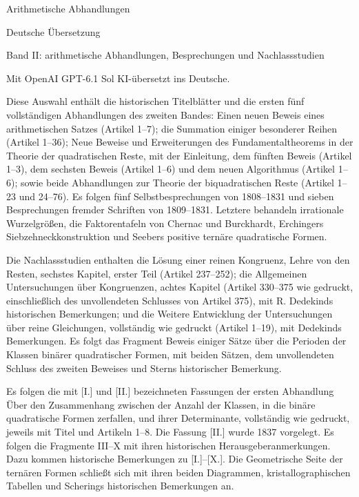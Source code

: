 \begin{titlepage}\centering
\vspace*{0cm}{\Large Carl Friedrich Gauss\par}\bigskip
{\huge Arithmetische Abhandlungen\par}\bigskip
{\Large Deutsche Übersetzung\par}\medskip
{\large Band II: arithmetische Abhandlungen, Besprechungen und Nachlassstudien\par}\bigskip\vfill
{\small Mit OpenAI GPT-6.1 Sol KI-übersetzt ins Deutsche.\par}
\clearpage\thispagestyle{empty}
\begin{minipage}{0.98\linewidth}\small\setlength{\baselineskip}{11.8pt}
Diese Auswahl enthält die historischen Titelblätter und die ersten fünf vollständigen Abhandlungen des zweiten Bandes: Einen neuen Beweis eines arithmetischen Satzes (Artikel 1–7); die Summation einiger besonderer Reihen (Artikel 1–36); Neue Beweise und Erweiterungen des Fundamentaltheorems in der Theorie der quadratischen Reste, mit der Einleitung, dem fünften Beweis (Artikel 1–3), dem sechsten Beweis (Artikel 1–6) und dem neuen Algorithmus (Artikel 1–6); sowie beide Abhandlungen zur Theorie der biquadratischen Reste (Artikel 1–23 und 24–76). Es folgen fünf Selbstbesprechungen von 1808–1831 und sieben Besprechungen fremder Schriften von 1809–1831. Letztere behandeln irrationale Wurzelgrößen, die Faktorentafeln von Chernac und Burckhardt, Erchingers Siebzehneckkonstruktion und Seebers positive ternäre quadratische Formen.

Die Nachlassstudien enthalten die Lösung einer reinen Kongruenz, Lehre von den Resten, sechstes Kapitel, erster Teil (Artikel 237–252); die Allgemeinen Untersuchungen über Kongruenzen, achtes Kapitel (Artikel 330–375 wie gedruckt, einschließlich des unvollendeten Schlusses von Artikel 375), mit R. Dedekinds historischen Bemerkungen; und die Weitere Entwicklung der Untersuchungen über reine Gleichungen, vollständig wie gedruckt (Artikel 1–19), mit Dedekinds Bemerkungen. Es folgt das Fragment Beweis einiger Sätze über die Perioden der Klassen binärer quadratischer Formen, mit beiden Sätzen, dem unvollendeten Schluss des zweiten Beweises und Sterns historischer Bemerkung.

Es folgen die mit [I.] und [II.] bezeichneten Fassungen der ersten Abhandlung Über den Zusammenhang zwischen der Anzahl der Klassen, in die binäre quadratische Formen zerfallen, und ihrer Determinante, vollständig wie gedruckt, jeweils mit Titel und Artikeln 1–8. Die Fassung [II.] wurde 1837 vorgelegt. Es folgen die Fragmente III–X mit ihren historischen Herausgeberanmerkungen. Dazu kommen historische Bemerkungen zu [I.]–[X.]. Die Geometrische Seite der ternären Formen schließt sich mit ihren beiden Diagrammen, kristallographischen Tabellen und Scherings historischen Bemerkungen an.


\end{minipage}
\end{titlepage}
